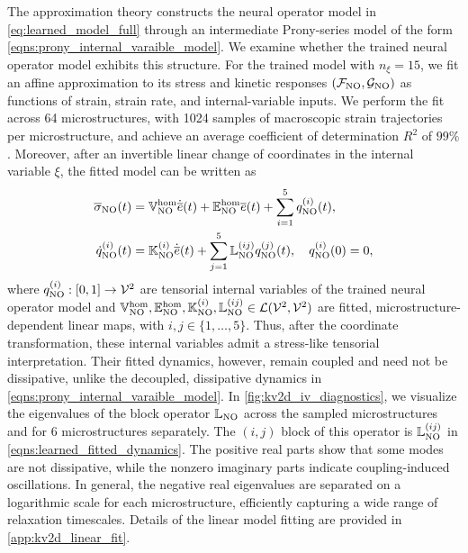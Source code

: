 \documentclass[3p, 12pt, preprint]{elsarticle}
\begin{document}
The approximation theory constructs the neural operator model in \cref{eq:learned_model_full} through an intermediate Prony-series model of the form \cref{eqns:prony_internal_varaible_model}. We examine whether the trained neural operator model exhibits this structure. For the trained model with $n_{\xi}=15$, we fit an affine approximation to its stress and kinetic responses $({\mathcal{F}}_{\rm NO}, {\mathcal{G}}_{\rm NO})$ as functions of strain, strain rate, and internal-variable inputs. We perform the fit across 64 microstructures, with 1024 samples of macroscopic strain trajectories per microstructure, and achieve an average coefficient of determination $R^2$ of $99\%$. Moreover, after an invertible linear change of coordinates in the internal variable $\xi$, the fitted model can be written as
\begin{subequations}\label{eqns:learned_fitted_dynamics}
\begin{align}
    \overline{\sigma}_{\rm NO}(t)&=\mathbb{V}^{\rm hom}_{\rm NO}\dot{\overline{e}}(t) + \mathbb{E}^{\rm hom}_{\rm NO}\overline{e}(t)+\sum_{i=1}^{5} q_{\rm NO}^{(i)}(t),\\
    \dot{q}_{\rm NO}^{(i)}(t)
    &=\mathbb{K}_{\rm NO}^{(i)}\dot{\overline{e}}(t) + \sum_{j=1}^5\mathbb{L}_{\rm NO}^{(ij)} q_{\rm NO}^{(j)}(t),
    \quad q_{\rm NO}^{(i)}(0)=0,
\end{align}
\end{subequations}
where $q_{\rm NO}^{(i)}:[0,1]\to{\mathcal{V}}^2$ are tensorial internal variables of the trained neural operator model and {$\mathbb{V}^{\rm hom}_{\rm NO}, \mathbb{E}^{\rm hom}_{\rm NO}, \mathbb{K}_{\rm NO}^{(i)},\mathbb{L}_{\rm NO}^{(ij)}\in{\mathcal{L}}({\mathcal{V}}^2,{\mathcal{V}}^2)$ are fitted, microstructure-dependent linear maps}, with $i,j\in\{1,\dots, 5\}$. Thus, after the coordinate transformation, these internal variables admit a stress-like tensorial interpretation. Their fitted dynamics, however, remain coupled and need not be dissipative, unlike the decoupled, dissipative dynamics in \cref{eqns:prony_internal_varaible_model}. In \cref{fig:kv2d_iv_diagnostics}, we visualize the eigenvalues of the {block operator} $\mathbb{L}_{\rm NO}$ across the sampled microstructures and for 6 microstructures separately. The $(i,j)$ block of this {operator} is $\mathbb{L}_{\rm NO}^{(ij)}$ in \cref{eqns:learned_fitted_dynamics}. The positive real parts show that some modes are not dissipative, while the nonzero imaginary parts indicate coupling-induced oscillations. In general, the negative real eigenvalues are separated on a logarithmic scale for each microstructure, efficiently capturing a wide range of relaxation timescales. Details of the linear model fitting are provided in \cref{app:kv2d_linear_fit}.
\end{document}
